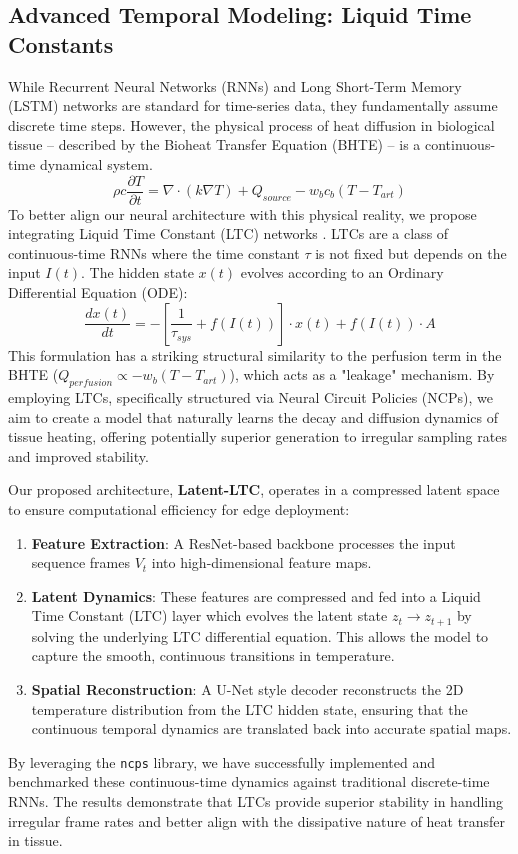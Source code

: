 \subsection{Advanced Temporal Modeling: Liquid Time Constants}
While Recurrent Neural Networks (RNNs) and Long Short-Term Memory (LSTM) networks are standard for time-series data, they fundamentally assume discrete time steps. However, the physical process of heat diffusion in biological tissue -- described by the Bioheat Transfer Equation (BHTE) -- is a continuous-time dynamical system.
\begin{equation}
    \rho c \frac{\partial T}{\partial t} = \nabla \cdot (k \nabla T) + Q_{source} - w_b c_b (T - T_{art})
\end{equation}
To better align our neural architecture with this physical reality, we propose integrating Liquid Time Constant (LTC) networks \cite{lechner2020neural}. LTCs are a class of continuous-time RNNs where the time constant $\tau$ is not fixed but depends on the input $I(t)$. The hidden state $x(t)$ evolves according to an Ordinary Differential Equation (ODE):
\begin{equation}
    \frac{dx(t)}{dt} = - \left[ \frac{1}{\tau_{sys}} + f(I(t)) \right] \cdot x(t) + f(I(t)) \cdot A
\end{equation}
This formulation has a striking structural similarity to the perfusion term in the BHTE ($Q_{perfusion} \propto -w_b (T - T_{art})$), which acts as a "leakage" mechanism. By employing LTCs, specifically structured via Neural Circuit Policies (NCPs), we aim to create a model that naturally learns the decay and diffusion dynamics of tissue heating, offering potentially superior generation to irregular sampling rates and improved stability.

Our proposed architecture, \textbf{Latent-LTC}, operates in a compressed latent space to ensure computational efficiency for edge deployment:
\begin{enumerate}
    \item \textbf{Feature Extraction}: A ResNet-based backbone processes the input sequence frames $V_t$ into high-dimensional feature maps.
    \item \textbf{Latent Dynamics}: These features are compressed and fed into a Liquid Time Constant (LTC) layer which evolves the latent state $z_t \to z_{t+1}$ by solving the underlying LTC differential equation. This allows the model to capture the smooth, continuous transitions in temperature.
    \item \textbf{Spatial Reconstruction}: A U-Net style decoder reconstructs the 2D temperature distribution from the LTC hidden state, ensuring that the continuous temporal dynamics are translated back into accurate spatial maps.
\end{enumerate}
By leveraging the \texttt{ncps} library, we have successfully implemented and benchmarked these continuous-time dynamics against traditional discrete-time RNNs. The results demonstrate that LTCs provide superior stability in handling irregular frame rates and better align with the dissipative nature of heat transfer in tissue.
